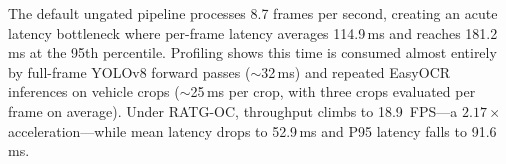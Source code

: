 \begin{table}[t]
\caption{System Performance on 720p Urban Intersection Video}
\label{tab:benchmark}
\centering
\renewcommand{\arraystretch}{1.15}
\setlength{\tabcolsep}{4pt}
\end{table}

The default ungated pipeline processes 8.7 frames per second, creating an acute latency bottleneck where per-frame latency averages 114.9\,ms and reaches 181.2\,ms at the 95th percentile. Profiling shows this time is consumed almost entirely by full-frame YOLOv8 forward passes ($\sim$32\,ms) and repeated EasyOCR inferences on vehicle crops ($\sim$25\,ms per crop, with three crops evaluated per frame on average). Under RATG-OC, throughput climbs to 18.9~FPS---a $2.17\times$ acceleration---while mean latency drops to 52.9\,ms and P95 latency falls to 91.6\,ms.

